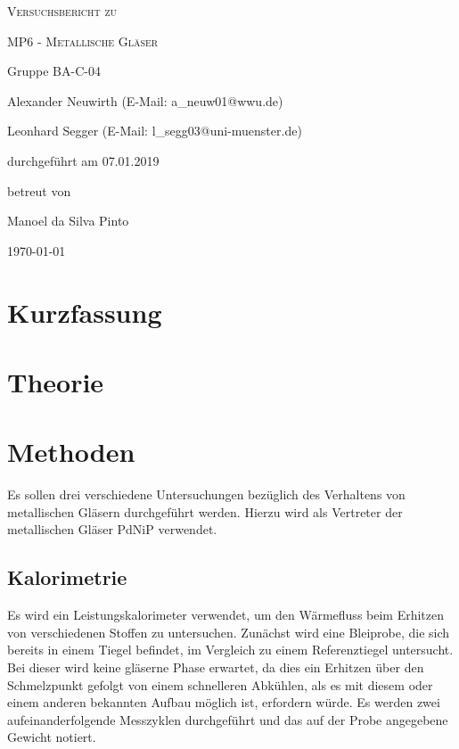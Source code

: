 \documentclass[
	a4paper,
	12pt,
	pagesize,
	ngerman
]{scrartcl}
\begin{document}
	\begin{titlepage}
		\centering
		{\scshape\LARGE Versuchsbericht zu \par}
		\vspace{1cm}
		{\scshape\huge MP6 - Metallische Gläser \par}
		\vspace{2.5cm}
		{\LARGE Gruppe BA-C-04 \par}
		\vspace{0.5cm}

		{\large Alexander Neuwirth (E-Mail: a\_neuw01@wwu.de) \par}
		{\large Leonhard Segger (E-Mail: l\_segg03@uni-muenster.de) \par}
		\vfill

		durchgeführt am 07.01.2019\par
		betreut von\par
		{\large Manoel da Silva Pinto}

		\vfill

		{\large \today\par}
	\end{titlepage}
	\tableofcontents
	\newpage

	\section{Kurzfassung}

  \section{Theorie}


	\section{Methoden} %
	Es sollen drei verschiedene Untersuchungen bezüglich des Verhaltens von metallischen Gläsern durchgeführt werden.
	Hierzu wird als Vertreter der metallischen Gläser PdNiP verwendet.

	\subsection{Kalorimetrie}
	Es wird ein Leistungskalorimeter verwendet, um den Wärmefluss beim Erhitzen von verschiedenen Stoffen zu untersuchen.
	Zunächst wird eine Bleiprobe, die sich bereits in einem Tiegel befindet, im Vergleich zu einem Referenztiegel untersucht.
	Bei dieser wird keine gläserne Phase erwartet, da dies ein Erhitzen über den Schmelzpunkt gefolgt von einem schnelleren Abkühlen, als es mit diesem oder einem anderen bekannten Aufbau möglich ist, erfordern würde.
	Es werden zwei aufeinanderfolgende Messzyklen durchgeführt und das auf der Probe angegebene Gewicht notiert.
\end{document}

